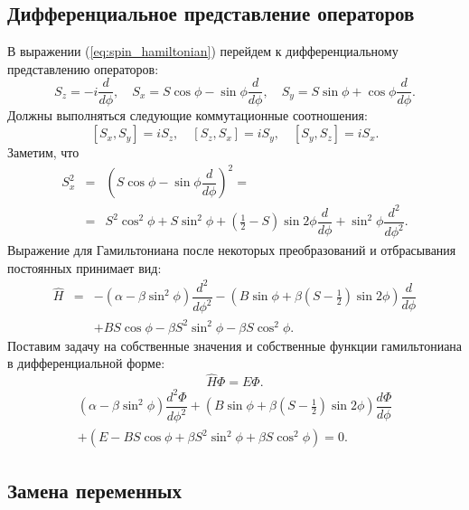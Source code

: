 \documentclass[12pt]{article}
\begin{document}
\subsection*{Дифференциальное представление операторов}

В выражении (\ref{eq:spin_hamiltonian}) перейдем к дифференциальному представлению операторов:
%
\begin{equation}
S_z = -i \dfrac{d}{d \phi}, \quad S_x = S \cos \phi - \sin \phi \dfrac{d}{d \phi}, \quad S_y = S \sin \phi + \cos \phi \dfrac{d}{d \phi}.
\label{eq:diff_repr}
\end{equation}
%
Должны выполняться следующие коммутационные соотношения:
%
$$[S_x, S_y] = iS_z, \quad [S_z, S_x] = iS_y, \quad [S_y, S_z] = iS_x.$$
%
Заметим, что
%
\begin{equation}
\begin{array}{lcl}
	S_x^2 & = & (S \cos \phi - \sin \phi \dfrac{d}{d \phi})^2 = \\
	& = & S^2 \cos^2 \phi + S \sin^2 \phi + (\frac{1}{2} - S) \sin 2 \phi \dfrac{d}{d \phi} + \sin^2 \phi \dfrac{d^2}{d \phi^2}.
\end{array}
\end{equation}
%
Выражение для Гамильтониана после некоторых преобразований и отбрасывания постоянных принимает вид:
%
\begin{equation*}
\begin{array}{lcl}
	\hat{H} & = & -(\alpha - \beta \sin^2 \phi) \dfrac{d^2}{d \phi^2} - (B \sin \phi + \beta (S - \frac{1}{2}) \sin 2 \phi) \dfrac{d}{d \phi} \\[10pt]
	&& + BS \cos \phi - \beta S^2 \sin^2 \phi - \beta S \cos^2 \phi.
\end{array}
\end{equation*}
%
Поставим задачу на собственные значения и собственные функции гамильтониана в дифференциальной форме:
%
\begin{equation}
\hat{H} \Phi = E \Phi.
\end{equation}
%
\begin{equation}
\begin{array}{l}
	(\alpha - \beta \sin^2 \phi) \dfrac{d^2 \Phi}{d \phi^2} + (B \sin \phi + \beta (S - \frac{1}{2}) \sin 2\phi) \dfrac{d \Phi}{d \phi} \\[10pt]
	+ (E - BS \cos \phi + \beta S^2 \sin^2 \phi + \beta S \cos^2 \phi) = 0.
\end{array}
\end{equation}

\subsection*{Замена переменных}
\end{document}
